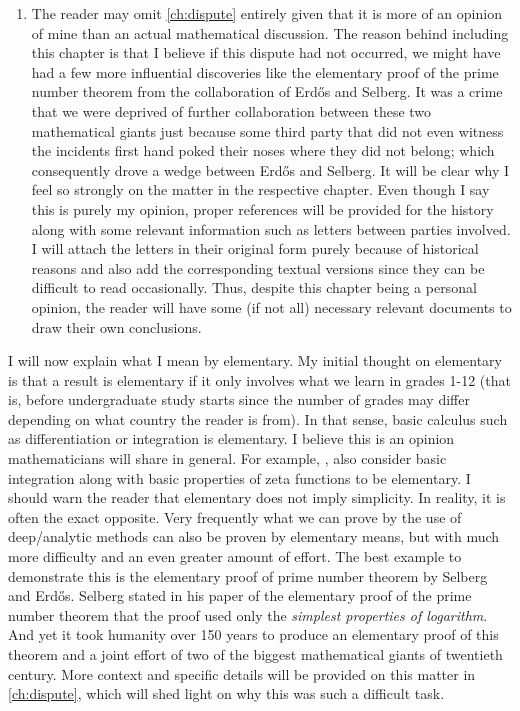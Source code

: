 \documentclass[12pt,leqno]{book}
\theoremstyle{definition}
\begin{document}
\begin{enumerate}[(1)]
			\item The reader may omit \autoref{ch:dispute} entirely given that it is more of an opinion of mine than an actual mathematical discussion. The reason behind including this chapter is that I believe if this dispute had not occurred, we might have had a few more influential discoveries like the elementary proof of the prime number theorem from the collaboration of Erd\H{o}s and Selberg. It was a crime that we were deprived of further collaboration between these two mathematical giants just because some third party that did not even witness the incidents first hand poked their noses where they did not belong; which consequently drove a wedge between Erd\H{o}s and Selberg. It will be clear why I feel so strongly on the matter in the respective chapter. Even though I say this is purely my opinion, proper references will be provided for the history along with some relevant information such as letters between parties involved. I will attach the letters in their original form purely because of historical reasons and also add the corresponding textual versions since they can be difficult to read occasionally. Thus, despite this chapter being a personal opinion, the reader will have some (if not all) necessary relevant documents to draw their own conclusions.
		\end{enumerate}
	I will now explain what I mean by elementary. My initial thought on elementary is that a result is elementary if it only involves what we learn in grades 1-12 (that is, before undergraduate study starts since the number of grades may differ depending on what country the reader is from). In that sense, basic calculus such as differentiation or integration is elementary. I believe this is an opinion mathematicians will share in general. For example, \textcite{landau_1969}, \textcite{ingham_1932} also consider basic integration along with basic properties of zeta functions to be elementary. I should warn the reader that elementary does not imply simplicity. In reality, it is often the exact opposite. Very frequently what we can prove by the use of deep/analytic methods can also be proven by elementary means, but with much more difficulty and an even greater amount of effort. The best example to demonstrate this is the elementary proof of prime number theorem by Selberg and Erd\H{o}s. Selberg stated in his paper of the elementary proof of the prime number theorem that the proof used only the \textit{simplest properties of logarithm}. And yet it took humanity over 150 years to produce an elementary proof of this theorem and a joint effort of two of the biggest mathematical giants of twentieth century. More context and specific details will be provided on this matter in \autoref{ch:dispute},  which will shed light on why this was such a difficult task.
\end{document}
